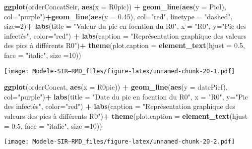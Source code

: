 \documentclass[
]{article}
\newenvironment{Shaded}{\begin{snugshade}}{\end{snugshade}}
\newcommand{\DataTypeTok}[1]{\textcolor[rgb]{0.13,0.29,0.53}{#1}}
\newcommand{\DecValTok}[1]{\textcolor[rgb]{0.00,0.00,0.81}{#1}}
\newcommand{\FloatTok}[1]{\textcolor[rgb]{0.00,0.00,0.81}{#1}}
\newcommand{\KeywordTok}[1]{\textcolor[rgb]{0.13,0.29,0.53}{\textbf{#1}}}
\newcommand{\NormalTok}[1]{#1}
\newcommand{\OperatorTok}[1]{\textcolor[rgb]{0.81,0.36,0.00}{\textbf{#1}}}
\newcommand{\StringTok}[1]{\textcolor[rgb]{0.31,0.60,0.02}{#1}}
\begin{document}
\begin{Shaded}
\begin{Highlighting}[]
\KeywordTok{ggplot}\NormalTok{(orderConcatSeir, }\KeywordTok{aes}\NormalTok{(}\DataTypeTok{x =}\NormalTok{ R0pic)) }\OperatorTok{+}\StringTok{ }\KeywordTok{geom_line}\NormalTok{(}\KeywordTok{aes}\NormalTok{(}\DataTypeTok{y =}\NormalTok{ PicI), }\DataTypeTok{col=}\StringTok{"purple"}\NormalTok{)}\OperatorTok{+}\KeywordTok{geom_line}\NormalTok{(}\KeywordTok{aes}\NormalTok{(}\DataTypeTok{y =} \FloatTok{0.45}\NormalTok{), }\DataTypeTok{col=}\StringTok{"red"}\NormalTok{, }\DataTypeTok{linetype =} \StringTok{"dashed"}\NormalTok{, }\DataTypeTok{size=}\DecValTok{2}\NormalTok{)}\OperatorTok{+}\StringTok{ }\KeywordTok{labs}\NormalTok{(}\DataTypeTok{title =} \StringTok{"Valeur du pic en focntion du R0"}\NormalTok{, }\DataTypeTok{x =} \StringTok{"R0"}\NormalTok{, }\DataTypeTok{y=}\StringTok{"Pic des infectés"}\NormalTok{, }\DataTypeTok{color=}\StringTok{"red"}\NormalTok{) }\OperatorTok{+}\StringTok{ }\KeywordTok{labs}\NormalTok{(}\DataTypeTok{caption =} \StringTok{"Représentation graphique des valeurs des pics à différents R0"}\NormalTok{)}\OperatorTok{+}\StringTok{ }\KeywordTok{theme}\NormalTok{(}\DataTypeTok{plot.caption =} \KeywordTok{element_text}\NormalTok{(}\DataTypeTok{hjust =} \FloatTok{0.5}\NormalTok{, }\DataTypeTok{face =} \StringTok{"italic"}\NormalTok{, }\DataTypeTok{size =}\DecValTok{10}\NormalTok{))}
\end{Highlighting}
\end{Shaded}

\texttt{[image: Modele-SIR---RMD\_files/figure-latex/unnamed-chunk-20-1.pdf]}

\begin{Shaded}
\begin{Highlighting}[]
 \KeywordTok{ggplot}\NormalTok{(orderConcat, }\KeywordTok{aes}\NormalTok{(}\DataTypeTok{x =}\NormalTok{ R0pic)) }\OperatorTok{+}\StringTok{ }\KeywordTok{geom_line}\NormalTok{(}\KeywordTok{aes}\NormalTok{(}\DataTypeTok{y =}\NormalTok{ datePicI), }\DataTypeTok{col=}\StringTok{"purple"}\NormalTok{)}\OperatorTok{+}\StringTok{ }\KeywordTok{labs}\NormalTok{(}\DataTypeTok{title =} \StringTok{"Date du pic en focntion du R0"}\NormalTok{, }\DataTypeTok{x =} \StringTok{"R0"}\NormalTok{, }\DataTypeTok{y=}\StringTok{"Pic des infectés"}\NormalTok{, }\DataTypeTok{color=}\StringTok{"red"}\NormalTok{) }\OperatorTok{+}\StringTok{ }\KeywordTok{labs}\NormalTok{(}\DataTypeTok{caption =} \StringTok{"Représentation graphique des valeurs des pics à différents R0"}\NormalTok{)}\OperatorTok{+}\StringTok{ }\KeywordTok{theme}\NormalTok{(}\DataTypeTok{plot.caption =} \KeywordTok{element_text}\NormalTok{(}\DataTypeTok{hjust =} \FloatTok{0.5}\NormalTok{, }\DataTypeTok{face =} \StringTok{"italic"}\NormalTok{, }\DataTypeTok{size =}\DecValTok{10}\NormalTok{))}
\end{Highlighting}
\end{Shaded}

\texttt{[image: Modele-SIR---RMD\_files/figure-latex/unnamed-chunk-20-2.pdf]}
\end{document}
